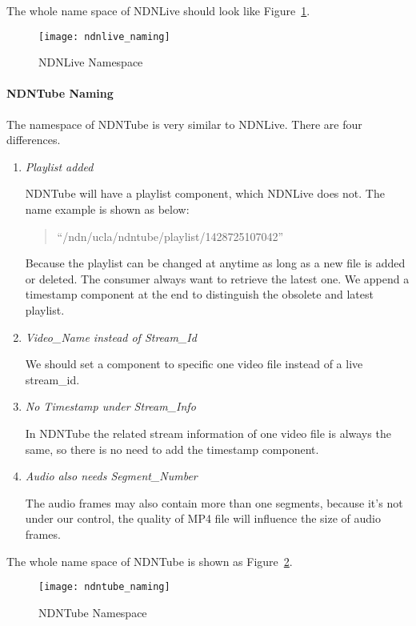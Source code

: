 The whole name space of NDNLive should look like Figure~\ref{fig:ndnlive_naming}.

\begin{figure}%
  \centering
  \texttt{[image: ndnlive\_naming]}
  \caption{NDNLive Namespace}
  \label{fig:ndnlive_naming}
\end{figure}
\paragraph{NDNTube Naming} %
\label{par:ndntube_naming}

The namespace of NDNTube is very similar to NDNLive. There are four differences.
\begin{enumerate}
	\item{\textit{Playlist added}} 
		
		NDNTube will have a playlist component, which NDNLive does not. The name example is shown as below: 
		\begin{quote}
		``/ndn/ucla/ndntube/playlist/1428725107042''
		\end{quote}
		Because the playlist can be changed at anytime as long as a new file is added or deleted. The consumer always want to retrieve the latest one. We append a timestamp component at the end to distinguish the obsolete and latest playlist.

	\item{\textit{Video\_Name instead of Stream\_Id}} 

		We should set a component to specific one video file instead of a live stream\_id.

	\item{\textit{No Timestamp under Stream\_Info}} 

		In NDNTube the related stream information of one video file is always the same, so there is no need to add the timestamp component.

	\item{\textit{Audio also needs Segment\_Number}} 

		The audio frames may also contain more than one segments, because it's not under our control, the quality of MP4 file will influence the size of audio frames.
\end{enumerate}

The whole name space of NDNTube is shown as Figure~\ref{fig:ndntube_naming}.

\begin{figure}%
  \centering
  \texttt{[image: ndntube\_naming]}
  \caption{NDNTube Namespace}
  \label{fig:ndntube_naming}
\end{figure}

